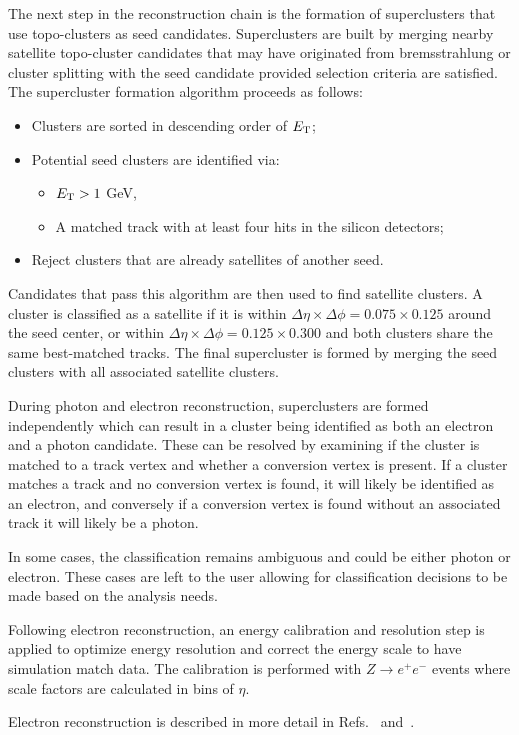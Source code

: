 The next step in the reconstruction chain is the formation of superclusters that use topo-clusters as seed candidates. Superclusters are built by merging nearby satellite topo-cluster candidates that may have originated from bremsstrahlung or cluster splitting with the seed candidate provided selection criteria are satisfied. The supercluster formation algorithm proceeds as follows:
\begin{itemize}
  \item Clusters are sorted in descending order of $E_{\mathrm{T}}$;
  \item Potential seed clusters are identified via:
  \begin{itemize}
    \item $E_{\mathrm{T}} > 1$ GeV,
    \item A matched track with at least four hits in the silicon detectors;
  \end{itemize}
  \item Reject clusters that are already satellites of another seed.
\end{itemize}
Candidates that pass this algorithm are then used to find satellite clusters. A cluster is classified as a satellite if it is within $\Delta\eta \times \Delta\phi = 0.075 \times 0.125$ around the seed center, or within $\Delta\eta \times \Delta\phi = 0.125 \times 0.300$ and both clusters share the same best-matched tracks. The final supercluster is formed by merging the seed clusters with all associated satellite clusters.

During photon and electron reconstruction, superclusters are formed independently which can result in a cluster being identified as both an electron and a photon candidate. These can be resolved by examining if the cluster is matched to a track vertex and whether a conversion vertex is present. If a cluster matches a track and no conversion vertex is found, it will likely be identified as an electron, and conversely if a conversion vertex is found without an associated track it will likely be a photon. 

In some cases, the classification remains ambiguous and could be either photon or electron. These cases are left to the user allowing for classification decisions to be made based on the analysis needs.

Following electron reconstruction, an energy calibration and resolution step is applied to optimize energy resolution and correct the energy scale to have simulation match data. The calibration is performed with $Z\rightarrow e^{+}e^{-}$ events where scale factors are calculated in bins of $\eta$.

Electron reconstruction is described in more detail in Refs.~\cite{ATLAS:2019qmc} and~\cite{ATLAS:2019jvq}.
